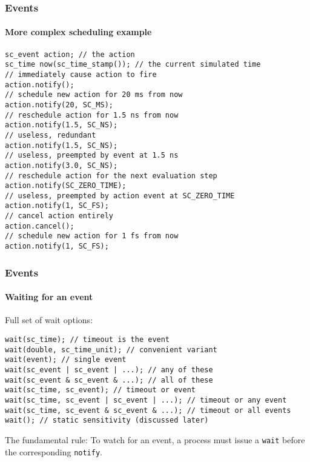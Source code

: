 \begin{frame}[fragile]
\frametitle{Events}
\framesubtitle{More complex scheduling example}

{\scriptsize 
\begin{verbatim}
sc_event action; // the action
sc_time now(sc_time_stamp()); // the current simulated time
// immediately cause action to fire
action.notify();
// schedule new action for 20 ms from now
action.notify(20, SC_MS);
// reschedule action for 1.5 ns from now
action.notify(1.5, SC_NS);
// useless, redundant
action.notify(1.5, SC_NS);
// useless, preempted by event at 1.5 ns
action.notify(3.0, SC_NS);
// reschedule action for the next evaluation step
action.notify(SC_ZERO_TIME);
// useless, preempted by action event at SC_ZERO_TIME
action.notify(1, SC_FS);
// cancel action entirely
action.cancel();
// schedule new action for 1 fs from now
action.notify(1, SC_FS);
\end{verbatim}
}
\end{frame}

\begin{frame}[fragile]
\frametitle{Events}
\framesubtitle{Waiting for an event}

\begin{block}{Full set of wait options:}
\vspace{-1em}
{\scriptsize 
\begin{verbatim}
wait(sc_time); // timeout is the event
wait(double, sc_time_unit); // convenient variant
wait(event); // single event
wait(sc_event | sc_event | ...); // any of these
wait(sc_event & sc_event & ...); // all of these
wait(sc_time, sc_event); // timeout or event
wait(sc_time, sc_event | sc_event | ...); // timeout or any event
wait(sc_time, sc_event & sc_event & ...); // timeout or all events
wait(); // static sensitivity (discussed later)
\end{verbatim}
}
\vspace{-1em}
\end{block}
\pause
\begin{block}{The fundamental rule:}
To watch for an event, a process must issue a \texttt{wait} before the corresponding \texttt{notify}.
\end{block}
\end{frame}


